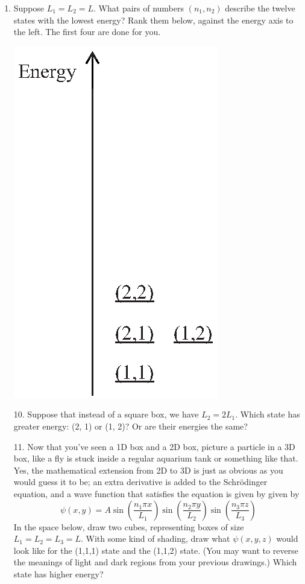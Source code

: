 \begin{enumerate}[wide]
\item Suppose $L_1=L_2=L$.   What pairs of numbers $(n_1,n_2)$ describe the twelve states with the lowest energy?  Rank them below, against the energy axis to the left.  The first four are done for you.
\begin{center}
\includegraphics[scale=0.8]{particle_in_2d_box/2d_box_energies.eps}
\end{center}

10.  Suppose that instead of a square box, we have $L_2=2L_1$.  Which state has greater energy: (2, 1) or (1, 2)?  Or are their energies the same?
\answerspace{0.6in}

11.  Now that you've seen a 1D box and a 2D box, picture a particle in a 3D box, like a fly is stuck inside a regular aquarium tank or something like that.  Yes, the mathematical extension from 2D to 3D is just as obvious as you would guess it to be; an extra derivative is added to the Schr\"odinger equation, and a wave function that satisfies the equation is given by given by
$$\displaystyle\psi(x,y)=A\sin\left(\frac{n_1\pi x}{L_1}\right)\sin\left(\frac{n_2\pi y}{L_2}\right)\sin\left(\frac{n_3\pi z}{L_3}\right)$$
In the space below, draw two cubes, representing boxes of size $L_1=L_2=L_3=L$.  With some kind of shading, draw what $\psi(x,y,z)$ would look like for the (1,1,1) state and the (1,1,2) state.  (You may want to reverse the meanings of light and dark regions from your previous drawings.) Which state has higher energy?
\answerspace{1.6in}

\end{enumerate}
